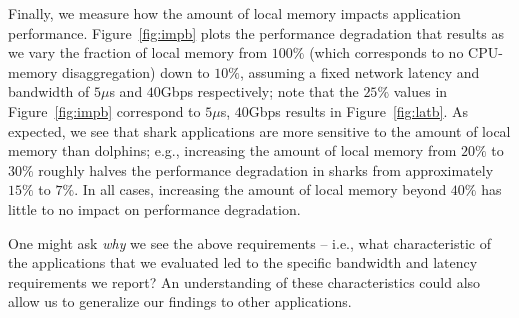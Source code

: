 Finally, we measure how the amount of local memory impacts application performance.
Figure~\ref{fig:impb} plots the performance degradation that results as we vary the fraction of local memory from $100\%$ (which corresponds to no CPU-memory disaggregation) down to $10\%$, assuming a fixed network latency and bandwidth of $5\mu$s and $40$Gbps respectively; note that the $25\%$ values in Figure~\ref{fig:impb} correspond to $5\mu$s, $40$Gbps results in Figure~\ref{fig:latb}. 
As expected, we see that shark applications are more sensitive to the amount of local memory than dolphins; e.g., increasing the amount of local memory from $20\%$ to $30\%$ roughly halves the performance degradation in sharks from approximately $15\%$ to $7\%$.
In all cases, increasing the amount of local memory beyond $40\%$ has little to no impact on performance degradation.



One might ask \emph{why} we see the above requirements -- i.e., what characteristic of the applications that we evaluated led to the specific bandwidth and latency requirements we report? An understanding of these characteristics could also allow us to generalize our findings to other applications. 



